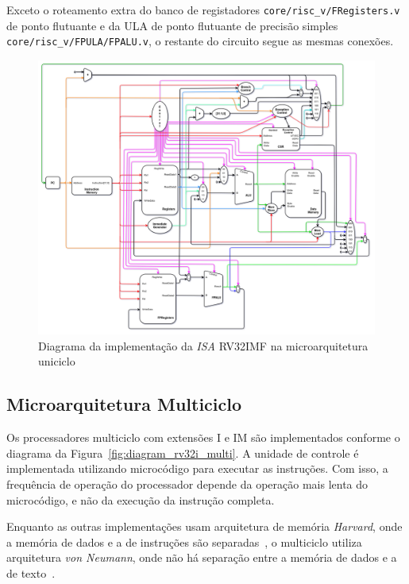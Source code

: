         { Exceto o roteamento extra do banco de registadores \texttt{core/risc\_v/FRegisters.v}
            de ponto flutuante e da ULA de ponto flutuante de precisão simples
            \texttt{core/risc\_v/FPULA/FPALU.v}, o restante do circuito segue as mesmas conexões.
        }

        \begin{figure}[H]
        \centering
            \includegraphics[width=.9\linewidth]{../images/uarch_diagrams/singlecycle-RV32IMF.png}
            \caption{Diagrama da implementação da \textit{ISA} RV32IMF na
            microarquitetura uniciclo}\label{fig:diagram_rv32imf_uni}
        \end{figure}

    \subsection{Microarquitetura Multiciclo}
        { Os processadores multiciclo com extensões I e IM são implementados
            conforme o diagrama da Figura~\ref{fig:diagram_rv32i_multi}. A
            unidade de controle é implementada utilizando microcódigo para
            executar as instruções. Com isso, a frequência de operação do
            processador depende da operação mais lenta do microcódigo, e não da
            execução da instrução completa.
        }

        { Enquanto as outras implementações usam arquitetura de memória \textit{Harvard},
            onde a memória de dados e a de instruções são separadas~\cite{harvard_arch},
            o multiciclo utiliza arquitetura \textit{von Neumann}, onde não há
            separação entre a memória de dados e a de texto~\cite{von_neumann_arch}.
        }

